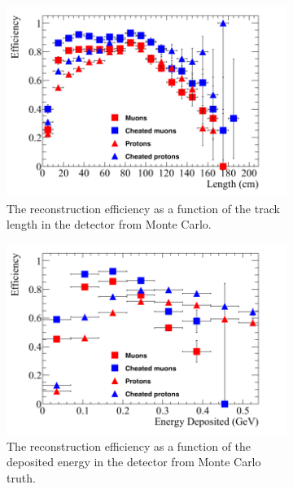 \begin{figure}
  \centering
  \begin{subfigure}{0.48\textwidth}
        \centering
        \includegraphics[width=\textwidth]{Effic_SingSamps_Length}
        \caption{The reconstruction efficiency as a function of the track length in the detector from Monte Carlo.}
        \label{fig:Isol_Effic_Len}
  \end{subfigure}%
  \hspace{0.03\textwidth}%
  \begin{subfigure}{0.48\textwidth}
        \centering
        \includegraphics[width=\textwidth]{Effic_SingSamps_EnDepos}
        \caption{The reconstruction efficiency as a function of the deposited energy in the detector from Monte Carlo truth.}
        \label{fig:Isol_Effic_EnDepos}
  \end{subfigure}
  \begin{subfigure}{0.48\textwidth}

\end{subfigure}
\end{figure}

